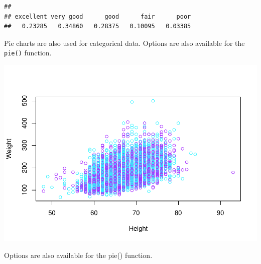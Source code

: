 \documentclass[
]{book}
\newenvironment{Shaded}{\begin{snugshade}}{\end{snugshade}}
\newcommand{\DataTypeTok}[1]{\textcolor[rgb]{0.13,0.29,0.53}{#1}}
\newcommand{\DecValTok}[1]{\textcolor[rgb]{0.00,0.00,0.81}{#1}}
\newcommand{\KeywordTok}[1]{\textcolor[rgb]{0.13,0.29,0.53}{\textbf{#1}}}
\newcommand{\NormalTok}[1]{#1}
\newcommand{\OperatorTok}[1]{\textcolor[rgb]{0.81,0.36,0.00}{\textbf{#1}}}
\newcommand{\StringTok}[1]{\textcolor[rgb]{0.31,0.60,0.02}{#1}}
\begin{document}
\begin{verbatim}
## 
## excellent very good      good      fair      poor 
##   0.23285   0.34860   0.28375   0.10095   0.03385
\end{verbatim}

Pie charts are also used for categorical data. Options are also available for the \texttt{pie()} function.

\begin{Shaded}
\end{Shaded}

\includegraphics{_main_files/figure-latex/unnamed-chunk-181-1.pdf}

Options are also available for the pie() function.

\begin{Shaded}
\end{Shaded}
\end{document}
